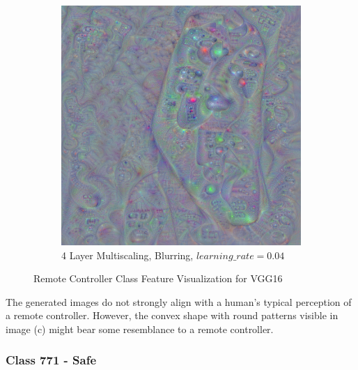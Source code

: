\begin{figure}
\begin{subfigure}[t]{0.31\textwidth}
    \end{subfigure}
    \hfill
    \begin{subfigure}[t]{0.31\textwidth}
        \captionsetup{justification=centering}
        \centering
        \includegraphics[width=.7\linewidth]{figuras/feat_vis/experiments/classes/cl761/random_image_ci761_lr4e-2_pl4.png}
        \caption{4 Layer Multiscaling, Blurring, \(learning\_rate = 0.04\)}
    \end{subfigure}

    \caption{Remote Controller Class Feature Visualization for VGG16}
    \label{fig:class_remote}
\end{figure}

The generated images do not strongly align with a human's typical perception of a remote controller. 
However, the convex shape with round patterns visible in image (c) might bear some resemblance to a remote controller.

\subsubsection{Class 771 - Safe}

